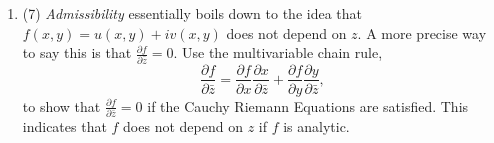\documentclass[11pt]{article}
\begin{document}
\begin{enumerate}
\begin{enumerate}
\begin{enumerate}
  \item (7) {\it Admissibility} essentially boils down to the idea that $f(x,y) = u(x, y) + iv(x, y)$ does not depend on $z$. A more precise way to say this is that $\frac{\partial f}{\partial \bar{z}} = 0$. Use the multivariable chain rule,
  \begin{equation*}
    \frac{\partial f}{\partial \bar{z}} = \frac{\partial f}{\partial x} \frac{\partial x}{\partial \bar{z}} + \frac{\partial f}{\partial y} \frac{\partial y}{\partial \bar{z}},
  \end{equation*}
  to show that $\frac{\partial f}{\partial \bar{z}} = 0$ if the Cauchy Riemann Equations are satisfied. This indicates that $f$ does not depend on $z$ if $f$ is analytic.
  
  \end{enumerate}
\end{enumerate}

\end{enumerate}
\end{document}

